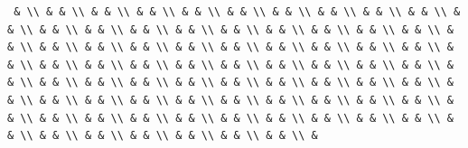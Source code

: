 \documentclass[
  ukrainian,
]{article}
\begin{document}
\begin{verbatim}
 & \\ & & \\ & & \\ & & \\ & & \\ & & \\ & & \\ & & \\ & & \\ & & \\ & & \\ & & \\ & & \\ & & \\ & & \\ & & \\ & & \\ & & \\ & & \\ & & \\ & & \\ & & \\ & & \\ & & \\ & & \\ & & \\ & & \\ & & \\ & & \\ & & \\ & & \\ & & \\ & & \\ & & \\ & & \\ & & \\ & & \\ & & \\ & & \\ & & \\ & & \\ & & \\ & & \\ & & \\ & & \\ & & \\ & & \\ & & \\ & & \\ & & \\ & & \\ & & \\ & & \\ & & \\ & & \\ & & \\ & & \\ & & \\ & & \\ & & \\ & & \\ & & \\ & & \\ & & \\ & & \\ & & \\ & & \\ & & \\ & & \\ & & \\ & & \\ & & \\ & & \\ & & \\ & & \\ & & \\ & & \\ &
\end{verbatim}
\end{document}
